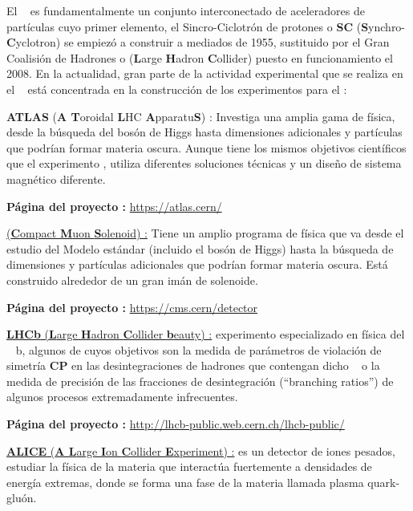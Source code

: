 El \CERN ~ es fundamentalmente un conjunto interconectado de aceleradores de partículas cuyo primer elemento, el Sincro-Ciclotrón de protones o \textbf{SC} (\textbf{S}ynchro-\textbf{C}yclotron) se empiezó a construir a mediados de 1955, sustituido por el Gran Coalisión de Hadrones  o \LHC (\textbf{L}arge \textbf{H}adron \textbf{C}ollider) puesto en funcionamiento el 2008. En la actualidad, gran parte de la actividad experimental que se realiza en el \CERN ~ está concentrada en la construcción de los experimentos para el \LHC:
\begin{itemize_f}
\item[-] \textbf{ATLAS} (\textbf{A T}oroidal \textbf{L}HC \textbf{A}pparatu\textbf{S}) : Investiga una amplia gama de física, desde la búsqueda del bosón de Higgs hasta dimensiones adicionales y partículas que podrían formar materia oscura. Aunque tiene los mismos objetivos científicos que el experimento \CMS, utiliza diferentes soluciones técnicas y un diseño de sistema magnético diferente.

\textbf{Página del proyecto :} \url{https://atlas.cern/}%

\item[-] \CMS \href{https://en.wikipedia.org/wiki/Compact_Muon_Solenoid}{(\textbf{C}ompact \textbf{M}uon \textbf{S}olenoid) :} Tiene un amplio programa de física que va desde el estudio del Modelo estándar (incluido el bosón de Higgs) hasta la búsqueda de dimensiones y partículas adicionales que podrían formar materia oscura. Está construido alrededor de un gran imán de solenoide.

\textbf{Página del proyecto :} \url{https://cms.cern/detector}%

\item[-] \href{https://es.wikipedia.org/wiki/LHCb}{\textbf{LHCb} (\textbf{L}arge \textbf{H}adron \textbf{C}ollider \textbf{b}eauty) :} experimento especializado en física del \quark ~ b, algunos de cuyos objetivos son la medida de parámetros de violación de simetría \textbf{CP} en las desintegraciones de hadrones que contengan dicho \quark ~ o la medida de precisión de las fracciones de desintegración (``branching ratios'') de algunos procesos extremadamente infrecuentes.

\textbf{Página del proyecto :} \url{http://lhcb-public.web.cern.ch/lhcb-public/}

\item[-] \href{https://en.wikipedia.org/wiki/ALICE_experiment}{\textbf{ALICE} (\textbf{A L}arge \textbf{I}on \textbf{C}ollider \textbf{E}xperiment) :} es un detector de iones pesados, estudiar la física de la materia que interactúa fuertemente a densidades de energía extremas, donde se forma una fase de la materia llamada plasma quark-gluón. 


\end{itemize_f}
